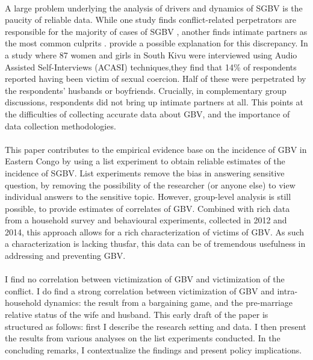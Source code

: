 \documentclass[11pt,a4paper]{scrartcl} %
\begin{document}
\paragraph{}
A large problem underlying the analysis of drivers and dynamics of SGBV is the paucity of reliable data. While one study finds conflict-related perpetrators are responsible for the majority of cases of SGBV \citep{Johnson2010}, another finds intimate partners as the most common culprits \citep{Peterman2011}. \citet{Stark2017} provide a possible explanation for this discrepancy. In a study where 87 women and girls in South Kivu were interviewed using Audio Assisted Self-Interviews (ACASI) techniques,they find that 14\% of respondents reported having been victim of sexual coercion. Half of these were perpetrated by the respondents' husbands or boyfriends. Crucially, in complementary group discussions, respondents did not bring up intimate partners at all. This points at the difficulties of collecting accurate data about GBV, and the importance of data collection methodologies. 
\paragraph{}
This paper contributes to the empirical evidence base on the incidence of GBV in Eastern Congo by using a list experiment to obtain reliable estimates of the incidence of SGBV. List experiments remove the bias in answering sensitive question, by removing the possibility of the researcher (or anyone else) to view individual answers to the sensitive topic. However, group-level analysis is still possible, to provide estimates of correlates of GBV. Combined with rich data from a household survey and behavioural experiments, collected in 2012 and 2014, this approach allows for a rich characterization of victims of GBV. As such a characterization is lacking thusfar, this data can be of tremendous usefulness in addressing and preventing GBV.
\paragraph{}
I find no correlation between victimization of GBV and victimization of the conflict. I do find a strong correlation between victimization of GBV and intra-household dynamics: the result from a bargaining game, and the pre-marriage relative status of the wife and husband. This early draft of the paper is structured as follows: first I describe the research setting and data. I then present the results from various analyses on the list experiments conducted. In the concluding remarks, I contextualize the findings and present policy implications.
\end{document}
